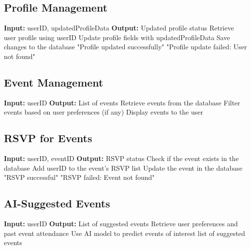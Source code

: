\subsection{Profile Management}
\begin{algorithmic}[1]
\State \textbf{Input:} userID, updatedProfileData
\State \textbf{Output:} Updated profile status
\State
\State Retrieve user profile using userID
    \State Update profile fields with updatedProfileData
    \State Save changes to the database
    \State \Return "Profile updated successfully"
\Else
    \State \Return "Profile update failed: User not found"
\EndIf
\end{algorithmic}

\subsection{Event Management}
\begin{algorithmic}[1]
\State \textbf{Input:} userID
\State \textbf{Output:} List of events
\State
\State Retrieve events from the database
\State Filter events based on user preferences (if any)
\State Display events to the user
\end{algorithmic}

\vspace{2cm}

\subsection{RSVP for Events}
\begin{algorithmic}[1]
\State \textbf{Input:} userID, eventID
\State \textbf{Output:} RSVP status
\State
\State Check if the event exists in the database
    \State Add userID to the event's RSVP list
    \State Update the event in the database
    \State \Return "RSVP successful"
\Else
    \State \Return "RSVP failed: Event not found"
\EndIf
\end{algorithmic}

\subsection{AI-Suggested Events}
\begin{algorithmic}[1]
\State \textbf{Input:} userID
\State \textbf{Output:} List of suggested events
\State
\State Retrieve user preferences and past event attendance
\State Use AI model to predict events of interest
\State \Return list of suggested events
\end{algorithmic}


